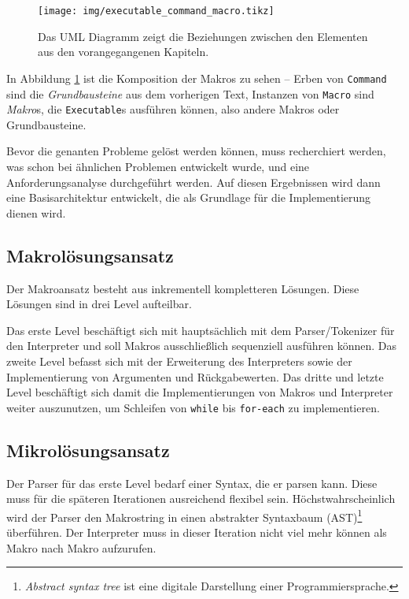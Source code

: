   \begin{figure}[H]
    \centering
    \texttt{[image: img/executable\_command\_macro.tikz]}
    \caption{Das UML Diagramm zeigt die Beziehungen zwischen den Elementen aus den vorangegangenen Kapiteln.}
    \label{fig:executable_command_macro}
  \end{figure}

  In Abbildung \ref{fig:executable_command_macro} ist die Komposition der Makros zu sehen -- Erben von \texttt{Command} sind die \textit{Grundbausteine} aus dem vorherigen Text, Instanzen von \texttt{Macro} sind \textit{Makro}s, die \texttt{Executable}s ausführen können, also andere Makros oder Grundbausteine.

  Bevor die genanten Probleme gelöst werden können, muss recherchiert werden, was schon bei ähnlichen Problemen entwickelt wurde, und eine Anforderungsanalyse durchgeführt werden. Auf diesen Ergebnissen wird dann eine Basisarchitektur entwickelt, die als Grundlage für die Implementierung dienen wird.

  \subsection{Makrolösungsansatz}
  \label{ssec:Makroloesungsansatz}
    Der Makroansatz besteht aus inkrementell kompletteren Lösungen. Diese Lösungen sind in drei Level aufteilbar.

    Das erste Level beschäftigt sich mit hauptsächlich mit dem Parser/Tokenizer für den Interpreter und soll Makros ausschließlich sequenziell ausführen können. Das zweite Level befasst sich mit der Erweiterung des Interpreters sowie der Implementierung von Argumenten und Rückgabewerten. Das dritte und letzte Level beschäftigt sich damit die Implementierungen von Makros und Interpreter weiter auszunutzen, um Schleifen von \texttt{while} bis \texttt{for-each} zu implementieren.

  \subsection{Mikrolösungsansatz}
  \label{ssec:Mikroloesungsansatz}
    Der Parser für das erste Level bedarf einer Syntax, die er parsen kann. Diese muss für die späteren Iterationen ausreichend flexibel sein. Höchstwahrscheinlich wird der Parser den Makrostring in einen abstrakter Syntaxbaum (AST)\footnote{%
      \textit{Abstract syntax tree} ist eine digitale Darstellung einer Programmiersprache.
    } überführen. Der Interpreter muss in dieser Iteration nicht viel mehr können als Makro nach Makro aufzurufen.

